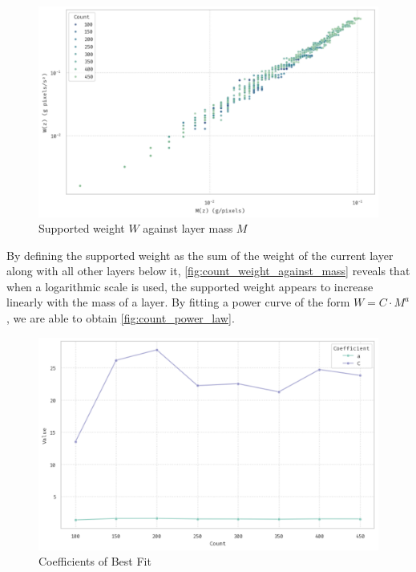 \documentclass[a4paper,10pt]{article}
\begin{document}
\begin{multicols}{2}
    \begin{figure}[H]
        \centering
        \includegraphics[width=\linewidth]{bee_count_weight.pdf}
        \caption{Supported weight $W$ against layer mass $M$}
        \label{fig:count_weight_against_mass}
    \end{figure}

    By defining the supported weight as the sum of the weight of the current layer along with all
    other layers below it, \autoref{fig:count_weight_against_mass} reveals that when a logarithmic scale is used,
    the supported weight appears to increase linearly with the mass of a layer. By fitting
    a power curve of the form $W = C \cdot M^{a}$, we are able to obtain \autoref{fig:count_power_law}.

    \begin{figure}[H]
        \centering
        \includegraphics[width=\linewidth]{bee_count_power_law.pdf}
        \caption{Coefficients of Best Fit}
        \label{fig:count_power_law}
    \end{figure}


\end{multicols}
\end{document}
